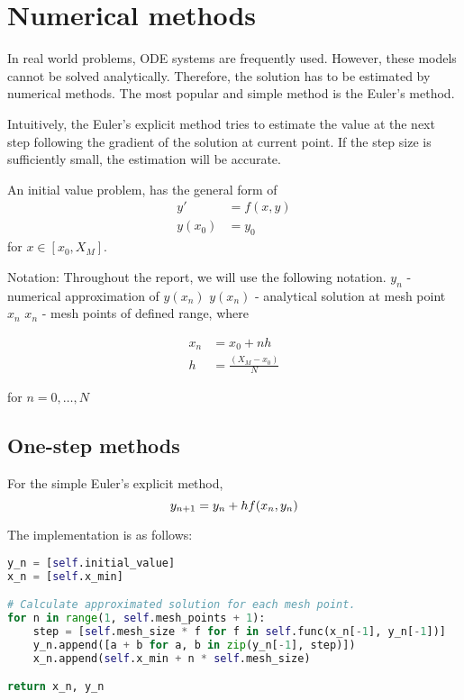 \chapter{Numerical methods}
\label{chap:numerical-methods}
In real world problems, ODE systems are frequently used. However, these models cannot be solved analytically. Therefore, the solution has to be estimated by numerical methods. The most popular and simple method is the Euler's method.

Intuitively, the Euler's explicit method tries to estimate the value at the next step following the gradient of the solution at current point. If the step size is sufficiently small, the estimation will be accurate.

An initial value problem, has the general form of 
\begin{align}
    y'&=f(x,y)\\
    y(x_0) &= y_0
\end{align}
for $x \in [x_0, X_M]$.

Notation:
Throughout the report, we will use the following notation.
$y_n$ - numerical approximation of $y(x_n)$
$y(x_n)$ - analytical solution at mesh point $x_n$
$x_n$ - mesh points of defined range, where

\begin{align}
    x_n &= x_0 + nh\\
    h &= \frac{(X_M - x_0)}{N}
\end{align}

for $n = 0,\dots, N$

\section{One-step methods}
For the simple Euler's explicit method, 
\begin{equation}
    y_{n+1} = y_n + hf(x_n,y_n)\\
\end{equation}

The implementation is as follows:

\begin{lstlisting}[language=Python]
y_n = [self.initial_value]
x_n = [self.x_min]

# Calculate approximated solution for each mesh point.
for n in range(1, self.mesh_points + 1):
    step = [self.mesh_size * f for f in self.func(x_n[-1], y_n[-1])]
    y_n.append([a + b for a, b in zip(y_n[-1], step)])
    x_n.append(self.x_min + n * self.mesh_size)

return x_n, y_n
\end{lstlisting}

